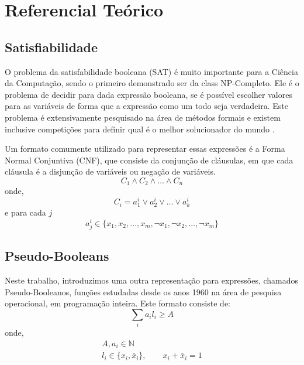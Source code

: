 \documentclass[conference]{IEEEtran}
\begin{document}
\section{Referencial Teórico}

\subsection{Satisfiabilidade}
O problema da satisfabilidade booleana (SAT) é muito importante para a Ciência da Computação, sendo o
primeiro demonstrado ser da class NP-Completo. Ele é o problema de decidir para dada expressão booleana,
se é possível escolher valores para as variáveis de forma que a expressão como um todo seja verdadeira.
Este problema é extensivamente pesquisado na área de métodos formais\cite{SatLive} e existem inclusive competições para
definir qual é o melhor solucionador do mundo \cite{SatComp}.

Um formato comumente utilizado para representar essas expressões é a Forma Normal Conjuntiva (CNF), que
consiste da conjunção de cláusulas, em que cada cláusula é a disjunção de variáveis ou negação de variáveis.
\begin{equation}
    C_1 \land C_2 \land \dots \land C_n
\end{equation}
onde,
\begin{equation}
    C_i = a_1^i \lor a_2^i \lor \dots \lor a_k^i
\end{equation}
e para cada $j$
\begin{equation}
    a_j^i \in \{ x_1,x_2,\dots,x_m,\neg x_1,\neg x_2,\dots, \neg x_m \}
\end{equation}

\subsection{Pseudo-Booleans}
Neste trabalho, introduzimos uma outra representação para expressões, chamados Pseudo-Booleanos, funções estudadas
desde os anos 1960 na área de pesquisa operacional, em programação inteira. Este formato consiste de:
\begin{equation}
    \sum_i{a_i l_i} \ge A
\end{equation}
onde,
\begin{equation}
    \begin{gathered}
        A, a_i \in \mathbb{N} \\
        l_i \in \{ x_i, \overline x_i \}, \qquad x_i + \overline x_i = 1
    \end{gathered}
\end{equation}
\end{document}
